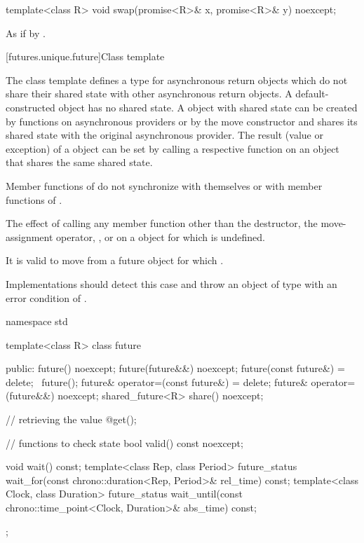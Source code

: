 %
\begin{itemdecl}
template<class R>
  void swap(promise<R>& x, promise<R>& y) noexcept;
\end{itemdecl}

\begin{itemdescr}
\pnum
\effects
As if by .
\end{itemdescr}

[futures.unique.future]{Class template }

\pnum
The class template  defines a type for asynchronous return objects which
do not share their shared state with other asynchronous return objects.
A default-constructed  object has no
shared state. A  object with shared state can be created by
functions on asynchronous providers or by the move constructor
and shares its shared state with
the original asynchronous provider. The result (value or exception) of
a  object
can be
set by
calling a respective function on an
object that shares the same
shared state.

\pnum
\begin{note}
Member functions of  do not synchronize with themselves or with
member functions of .
\end{note}

\pnum
The effect of calling any member function other than the destructor, the
move-assignment operator, , or  on a  object for which
is undefined.
\begin{note}
It is valid to move from a future object for which .
\end{note}

\recommended
Implementations should detect this case and throw an object of type
 with an error condition of .

%
\begin{codeblock}
namespace std {
  template<class R>
  class future {
  public:
    future() noexcept;
    future(future&&) noexcept;
    future(const future&) = delete;
    ~future();
    future& operator=(const future&) = delete;
    future& operator=(future&&) noexcept;
    shared_future<R> share() noexcept;

    // retrieving the value
    @\seebelow@ get();

    // functions to check state
    bool valid() const noexcept;

    void wait() const;
    template<class Rep, class Period>
      future_status wait_for(const chrono::duration<Rep, Period>& rel_time) const;
    template<class Clock, class Duration>
      future_status wait_until(const chrono::time_point<Clock, Duration>& abs_time) const;
  };
}
\end{codeblock}


